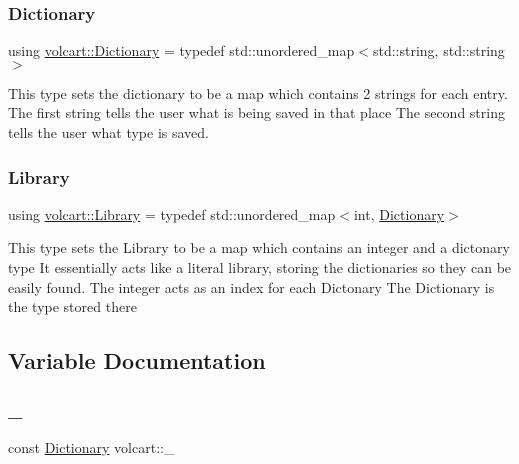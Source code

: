 \subsubsection{\texorpdfstring{Dictionary}{Dictionary}}
{\footnotesize\ttfamily using \hyperlink{namespacevolcart_aa4e334ff80b678b9556aee59618eb37a}{volcart\+::\+Dictionary} = typedef std\+::unordered\+\_\+map$<$std\+::string, std\+::string$>$}

This type sets the dictionary to be a map which contains 2 strings for each entry. The first string tells the user what is being saved in that place The second string tells the user what type is saved. \hypertarget{namespacevolcart_a90354e3717094cf66f2c1310f12b2e4e}{}\label{namespacevolcart_a90354e3717094cf66f2c1310f12b2e4e} 
\subsubsection{\texorpdfstring{Library}{Library}}
{\footnotesize\ttfamily using \hyperlink{namespacevolcart_a90354e3717094cf66f2c1310f12b2e4e}{volcart\+::\+Library} = typedef std\+::unordered\+\_\+map$<$int, \hyperlink{namespacevolcart_aa4e334ff80b678b9556aee59618eb37a}{Dictionary}$>$}

This type sets the Library to be a map which contains an integer and a dictonary type It essentially acts like a literal library, storing the dictionaries so they can be easily found. The integer acts as an index for each Dictonary The Dictionary is the type stored there 

\subsection{Variable Documentation}
\hypertarget{namespacevolcart_aff81b62f1e73f2f96669772bab7e2425}{}\label{namespacevolcart_aff81b62f1e73f2f96669772bab7e2425} 
\subsubsection{\texorpdfstring{\+\_}{\_1}}
{\footnotesize\ttfamily const \hyperlink{namespacevolcart_aa4e334ff80b678b9556aee59618eb37a}{Dictionary} volcart\+::\+\_}

